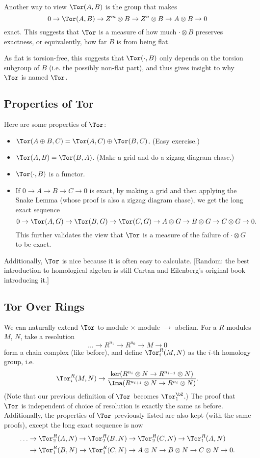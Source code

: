 Another way to view $\Tor(A,B)$ is the group that makes
\[
    0 \to \Tor(A,B) \to Z^m \otimes B \to Z^n \otimes B \to A \otimes B \to 0
\]
exact. This suggests that $\Tor$ is a measure of how much $\cdot \otimes B$ preserves exactness, or equivalently, how far $B$ is from being flat.

As flat is torsion-free, this suggests that $\Tor(\cdot, B)$ only depends on the torsion subgroup of $B$ (i.e. the possibly non-flat part), and thus gives insight to why $\Tor$ is named $\Tor$.

\subsection{Properties of Tor}
Here are some properties of $\Tor$:
\begin{itemize}
    \item $\Tor(A\oplus B, C) = \Tor(A, C) \oplus \Tor(B,C)$. (Easy exercise.)
    \item $\Tor(A,B) = \Tor(B,A)$. (Make a grid and do a zigzag diagram chase.)
    \item $\Tor(\cdot, B)$ is a functor.
    \item If $0 \to A \to B \to C \to 0$ is exact, by making a grid and then applying the Snake Lemma (whose proof is also a zigzag diagram chase), we get the long exact sequence
    \[
        0 \to \Tor(A,G) \to \Tor(B,G) \to \Tor(C,G) \to A \otimes G \to B \otimes G \to C \otimes G \to 0.
    \]
    This further validates the view that $\Tor$ is a measure of the failure of $\cdot \otimes G$ to be exact.
\end{itemize}

Additionally, $\Tor$ is nice because it is often easy to calculate. [Random: the best introduction to homological algebra is still Cartan and Eilenberg's original book introducing it.]

\subsection{Tor Over Rings}
We can naturally extend $\Tor$ to module $\times$ module $\to$ abelian. For a $R$-modules $M$, $N$, take a resolution
\[
    \dots \to R^{n_1} \to R^{n_0} \to M \to 0
\]
form a chain complex (like before), and define $\Tor_i^R(M,N)$ as the $i$-th homology group, i.e.
\[
    \Tor_i^R(M,N) \to \frac{\ker(R^{n_i} \otimes N \to R^{n_{i-1}} \otimes N)}{\Ima(R^{n_{i+1}} \otimes N \to R^{n_i} \otimes N)}.
\]
(Note that our previous definition of $\Tor$ becomes $\Tor_1^\bZ$.) The proof that $\Tor$ is independent of choice of resolution is exactly the same as before. Additionally, the properties of $\Tor$ previously listed are also kept (with the same proofs), except the long exact sequence is now
\[
    \begin{split}
        \dots & \to \Tor^R_2(A,N) \to \Tor^R_2(B,N) \to \Tor^R_2(C,N) \to \Tor^R_1(A,N) \\
              & \to \Tor^R_1(B,N) \to \Tor^R_1(C,N) \to A \otimes N \to B \otimes N \to C \otimes N \to 0.
    \end{split}
\]

